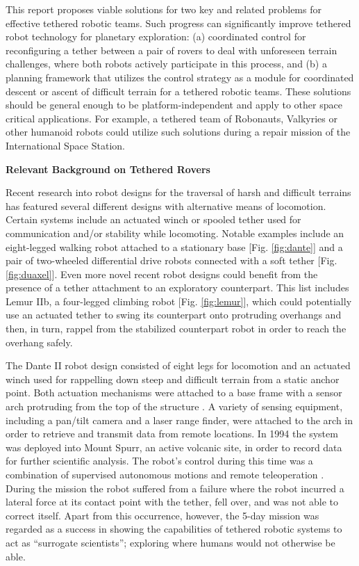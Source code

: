 \documentclass[12pt]{article}
\begin{document}
 This report proposes viable solutions for
two key and related problems for effective tethered robotic teams.
Such progress can significantly improve tethered robot technology for
planetary exploration: (a) coordinated control for reconfiguring a
tether between a pair of rovers to deal with unforeseen terrain
challenges, where both robots actively participate in this process,
and (b) a planning framework that utilizes the control strategy as a
module for coordinated descent or ascent of difficult terrain for a
tethered robotic teams.  These solutions should be general enough to
be platform-independent and apply to other space critical
applications. For example, a tethered team of Robonauts, Valkyries or
other humanoid robots could utilize such solutions during a repair
mission of the International Space Station.


{\bf\noindent Relevant Background on Tethered Rovers}

Recent research into robot designs for the traversal of harsh and
difficult terrains has featured several different designs with
alternative means of locomotion. Certain systems include an actuated
winch or spooled tether used for communication and/or stability while
locomoting.  Notable examples include an eight-legged walking robot
attached to a stationary base [Fig. \ref{fig:dante}] and a pair of
two-wheeled differential drive robots connected with a soft tether
[Fig. \ref{fig:duaxel}]. Even more novel recent robot designs could
benefit from the presence of a tether attachment to an exploratory
counterpart. This list includes Lemur IIb, a four-legged climbing
robot [Fig. \ref{fig:lemur}], which could potentially use an actuated
tether to swing its counterpart onto protruding overhangs and then, in
turn, rappel from the stabilized counterpart robot in order to reach
the overhang safely.


The Dante II robot design consisted of eight legs for locomotion and
an actuated winch used for rappelling down steep and difficult terrain
from a static anchor point.  Both actuation mechanisms were attached
to a base frame with a sensor arch protruding from the top of the
structure \cite{dante_design}. A variety of sensing equipment,
including a pan/tilt camera and a laser range finder, were attached to
the arch in order to retrieve and transmit data from remote
locations. In 1994 the system was deployed into Mount Spurr, an active
volcanic site, in order to record data for further scientific
analysis. The robot's control during this time was a combination of
supervised autonomous motions and remote teleoperation
\cite{dante_results}. During the mission the robot suffered from a
failure where the robot incurred a lateral force at its contact point
with the tether, fell over, and was not able to correct itself. Apart
from this occurrence, however, the 5-day mission was regarded as a
success in showing the capabilities of tethered robotic systems to act
as ``surrogate scientists''; exploring where humans would not
otherwise be able.
\end{document}
